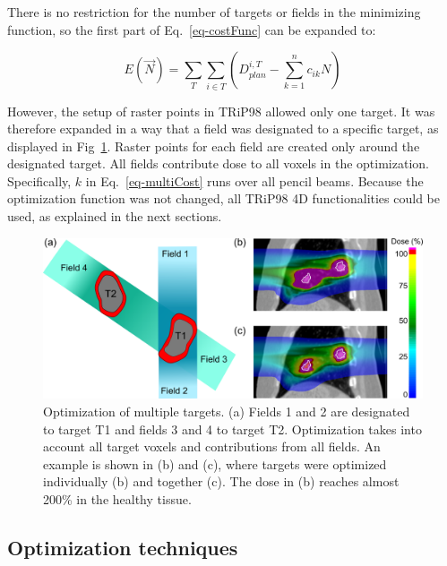 There is no restriction for the number of targets or fields in the minimizing function, so the first part of Eq.~\ref{eq-costFunc} can be expanded to:

\begin{equation}
\label{eq-multiCost}
 E(\vec{N}) = \sum_{T} \sum_{i\in T} \left( D_{plan}^{i,T} -\sum_{k=1}^n c_{ik}N\right)
\end{equation}

However, the setup of raster points in TRiP98 allowed only one target. It was therefore expanded in a way that a field was designated to a specific target, as displayed in Fig~\ref{Fig:multiTargets}. 
Raster points for each field are created only around the designated target. All fields contribute dose to all voxels in the optimization. Specifically, $k$ in Eq.~\ref{eq-multiCost} runs over all pencil beams. 
Because the optimization function was not changed, 
all TRiP98 4D functionalities could be used, as explained in the next sections.




\newpage


\begin{figure}[H]
	\begin{center}
		\includegraphics[width=1\textwidth]{./ComplexPatients/Images/multiTarget.png}
		\caption{Optimization of multiple targets. (a) Fields 1 and 2 are designated to target T1 and fields 3 and 4 to target T2. 
		Optimization takes into account all target voxels and contributions from all fields. An example is shown in (b) and (c), where targets
		were optimized individually (b) and together (c). The dose in (b) reaches almost 200\% in the healthy tissue.}
		\label{Fig:multiTargets}
	\end{center}
\end{figure}



\subsection{Optimization techniques}

